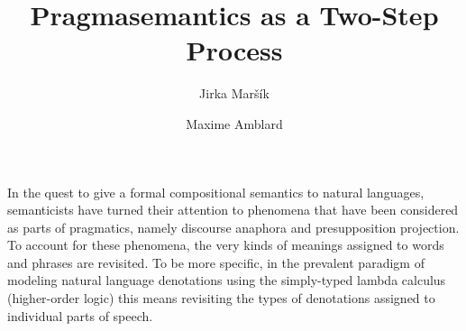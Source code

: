 \documentclass[a4paper,11pt]{article}
\title{Pragmasemantics as a Two-Step Process}
\author{Jirka Maršík \and Maxime Amblard}
\begin{document}
\maketitle


In the quest to give a formal compositional semantics to natural languages,
semanticists have turned their attention to phenomena that have been
considered as parts of pragmatics, namely discourse anaphora and
presupposition projection. To account for these phenomena, the very kinds
of meanings assigned to words and phrases are revisited. To be more
specific, in the prevalent paradigm of modeling natural language
denotations using the simply-typed lambda calculus (higher-order logic)
this means revisiting the types of denotations assigned to individual parts
of speech.






\end{document}

